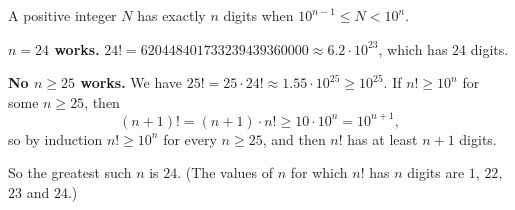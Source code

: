 A positive integer $N$ has exactly $n$ digits when $10^{n-1}\le N<10^n$.

\textbf{$n=24$ works.} $24!=620448401733239439360000\approx6.2\cdot10^{23}$, which has $24$ digits.

\textbf{No $n\ge25$ works.} We have $25!=25\cdot24!\approx1.55\cdot10^{25}\ge10^{25}$. If $n!\ge10^n$ for some $n\ge25$, then
\[
(n+1)!=(n+1)\cdot n!\ge10\cdot10^n=10^{n+1},
\]
so by induction $n!\ge10^n$ for every $n\ge25$, and then $n!$ has at least $n+1$ digits.

So the greatest such $n$ is $\boxed{24}$. (The values of $n$ for which $n!$ has $n$ digits are $1$, $22$, $23$ and $24$.)

